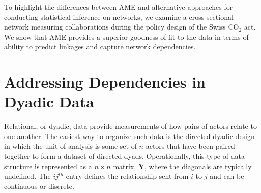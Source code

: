 \documentclass[12pt,pdflatex]{elsarticle}
\begin{document}
To highlight the differences between AME and alternative approaches for conducting statistical inference on networks, we examine a cross-sectional network measuring collaborations during the policy design of the Swiss CO$_{2}$ act. We show that AME provides a superior goodness of fit to the data in terms of ability to predict linkages and capture network dependencies. 
\\

\section*{\textbf{Addressing Dependencies in Dyadic Data}}


Relational, or dyadic, data provide measurements of how pairs of actors relate to one another. The easiest way to organize such data is the directed dyadic design in which the unit of analysis is some set of $n$ actors that have been paired together to form a dataset of directed dyads. Operationally, this type of data structure is represented as a $n \times n$ matrix, $\mathbf{Y}$, where the diagonals are typically undefined. The $ij^{th}$ entry defines the relationship sent from $i$ to $j$ and can be continuous or discrete.

\end{document}
